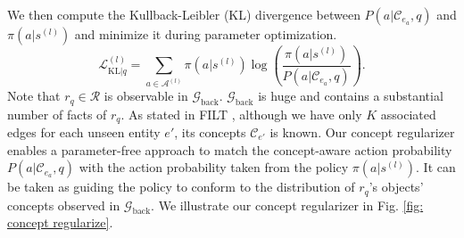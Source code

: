 \documentclass[runningheads]{llncs}
\begin{document}
We then compute the Kullback-Leibler (KL) divergence between $P(a|\mathcal{C}_{e_a},q)$ and $\pi(a|s^{(l)})$ and minimize it during parameter optimization.
\begin{equation}
\label{eq: kl}
    \mathcal{L}_{\text{KL}|q}^{(l)} = \sum_{a\in \mathcal{A}^{(l)}} \pi(a|s^{(l)}) \log \left(\frac{\pi(a|s^{(l)})}{P(a|\mathcal{C}_{e_a}, q)}\right).
\end{equation}
Note that $r_q \in \mathcal{R}$ is observable in $\mathcal{G}_{\text{back}}$. $\mathcal{G}_{\text{back}}$ is huge and contains a substantial number of facts of $r_q$. As stated in FILT \cite{ding2022few}, although we have only $K$ associated edges for each unseen entity $e'$, its concepts $\mathcal{C}_{e'}$ is known. Our concept regularizer enables a parameter-free approach to match the concept-aware action probability $P(a|\mathcal{C}_{e_a},q)$ with the action probability taken from the policy $\pi(a|s^{(l)})$. It can be taken as guiding the policy to conform to the distribution of $r_q$'s objects' concepts observed in $\mathcal{G}_{\text{back}}$. We illustrate our concept regularizer in Fig. \ref{fig: concept regularize}.
\end{document}
